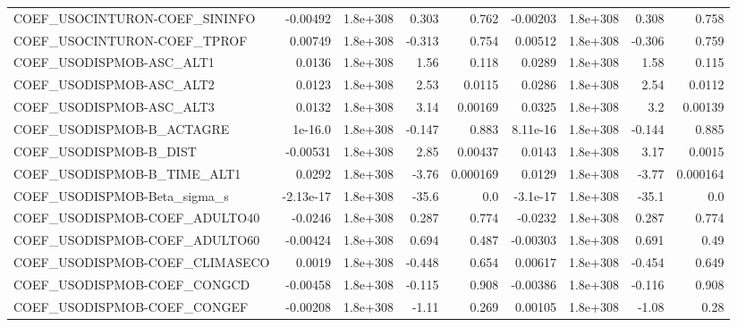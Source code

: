 \begin{tabular}{lrrrrrrrr}
COEF\_USOCINTURON-COEF\_SININFO     &    -0.00492 &     1.8e+308 &     0.303 &    0.762 &   -0.00203 &    1.8e+308 &        0.308 &         0.758 \\
COEF\_USOCINTURON-COEF\_TPROF       &     0.00749 &     1.8e+308 &    -0.313 &    0.754 &    0.00512 &    1.8e+308 &       -0.306 &         0.759 \\
COEF\_USODISPMOB-ASC\_ALT1          &      0.0136 &     1.8e+308 &      1.56 &    0.118 &     0.0289 &    1.8e+308 &         1.58 &         0.115 \\
COEF\_USODISPMOB-ASC\_ALT2          &      0.0123 &     1.8e+308 &      2.53 &   0.0115 &     0.0286 &    1.8e+308 &         2.54 &        0.0112 \\
COEF\_USODISPMOB-ASC\_ALT3          &      0.0132 &     1.8e+308 &      3.14 &  0.00169 &     0.0325 &    1.8e+308 &          3.2 &       0.00139 \\
COEF\_USODISPMOB-B\_ACTAGRE         &     1e-16.0 &     1.8e+308 &    -0.147 &    0.883 &   8.11e-16 &    1.8e+308 &       -0.144 &         0.885 \\
COEF\_USODISPMOB-B\_DIST            &    -0.00531 &     1.8e+308 &      2.85 &  0.00437 &     0.0143 &    1.8e+308 &         3.17 &        0.0015 \\
COEF\_USODISPMOB-B\_TIME\_ALT1       &      0.0292 &     1.8e+308 &     -3.76 & 0.000169 &     0.0129 &    1.8e+308 &        -3.77 &      0.000164 \\
COEF\_USODISPMOB-Beta\_sigma\_s      &   -2.13e-17 &     1.8e+308 &     -35.6 &      0.0 &   -3.1e-17 &    1.8e+308 &        -35.1 &           0.0 \\
COEF\_USODISPMOB-COEF\_ADULTO40     &     -0.0246 &     1.8e+308 &     0.287 &    0.774 &    -0.0232 &    1.8e+308 &        0.287 &         0.774 \\
COEF\_USODISPMOB-COEF\_ADULTO60     &    -0.00424 &     1.8e+308 &     0.694 &    0.487 &   -0.00303 &    1.8e+308 &        0.691 &          0.49 \\
COEF\_USODISPMOB-COEF\_CLIMASECO    &      0.0019 &     1.8e+308 &    -0.448 &    0.654 &    0.00617 &    1.8e+308 &       -0.454 &         0.649 \\
COEF\_USODISPMOB-COEF\_CONGCD       &    -0.00458 &     1.8e+308 &    -0.115 &    0.908 &   -0.00386 &    1.8e+308 &       -0.116 &         0.908 \\
COEF\_USODISPMOB-COEF\_CONGEF       &    -0.00208 &     1.8e+308 &     -1.11 &    0.269 &    0.00105 &    1.8e+308 &        -1.08 &          0.28 \\

\end{tabular}
